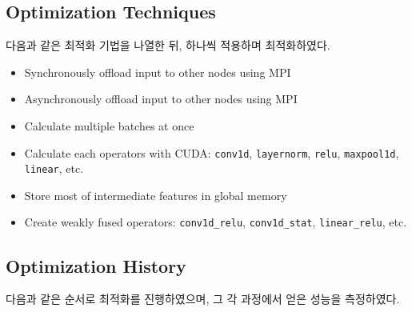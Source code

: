 \subsection{Optimization Techniques}

다음과 같은 최적화 기법을 나열한 뒤, 하나씩 적용하며 최적화하였다.

\begin{itemize}
    \item Synchronously offload input to other nodes using MPI

    \item Asynchronously offload input to other nodes using MPI

    \item Calculate multiple batches at once

    \item Calculate each operators with CUDA: \texttt{conv1d}, \texttt{layernorm}, \texttt{relu}, \texttt{maxpool1d}, \texttt{linear}, etc.
        
    \item Store most of intermediate features in global memory
    
    \item Create weakly fused operators: \texttt{conv1d\_relu}, \texttt{conv1d\_stat}, \texttt{linear\_relu}, etc.

\end{itemize}

\subsection{Optimization History}

다음과 같은 순서로 최적화를 진행하였으며, 그 각 과정에서 얻은 성능을 측정하였다.

